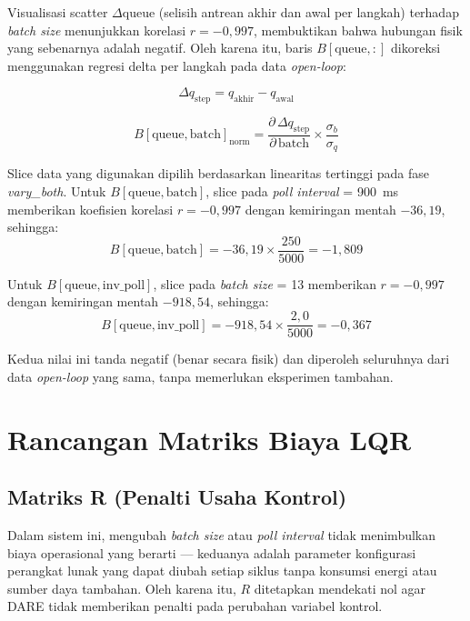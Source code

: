 Visualisasi scatter $\Delta\text{queue}$ (selisih antrean akhir dan awal per langkah) terhadap
\emph{batch size} menunjukkan korelasi $r = -0{,}997$, membuktikan bahwa hubungan fisik yang
sebenarnya adalah negatif.
Oleh karena itu, baris $B[\text{queue}, :]$ dikoreksi menggunakan regresi delta per langkah
pada data \emph{open-loop}:

\begin{equation}
\Delta q_{\text{step}} = q_{\text{akhir}} - q_{\text{awal}}
\end{equation}

\begin{equation}
B[\text{queue}, \text{batch}]_{\text{norm}} = \frac{\partial\, \Delta q_{\text{step}}}{\partial\, \text{batch}} \times \frac{\sigma_b}{\sigma_q}
\end{equation}

Slice data yang digunakan dipilih berdasarkan linearitas tertinggi pada fase \emph{vary\_both}.
Untuk $B[\text{queue}, \text{batch}]$, slice pada \emph{poll interval} = 900~ms memberikan
koefisien korelasi $r = -0{,}997$ dengan kemiringan mentah $-36{,}19$, sehingga:
\begin{equation}
B[\text{queue}, \text{batch}] = -36{,}19 \times \frac{250}{5000} = -1{,}809
\end{equation}

Untuk $B[\text{queue}, \text{inv\_poll}]$, slice pada \emph{batch size} = 13 memberikan
$r = -0{,}997$ dengan kemiringan mentah $-918{,}54$, sehingga:
\begin{equation}
B[\text{queue}, \text{inv\_poll}] = -918{,}54 \times \frac{2{,}0}{5000} = -0{,}367
\end{equation}

Kedua nilai ini tanda negatif (benar secara fisik) dan diperoleh seluruhnya dari data
\emph{open-loop} yang sama, tanpa memerlukan eksperimen tambahan.

\section{Rancangan Matriks Biaya LQR}

\subsection{Matriks R (Penalti Usaha Kontrol)}

Dalam sistem ini, mengubah \emph{batch size} atau \emph{poll interval} tidak menimbulkan
biaya operasional yang berarti — keduanya adalah parameter konfigurasi perangkat lunak yang
dapat diubah setiap siklus tanpa konsumsi energi atau sumber daya tambahan.
Oleh karena itu, $R$ ditetapkan mendekati nol agar DARE tidak memberikan penalti pada
perubahan variabel kontrol.

